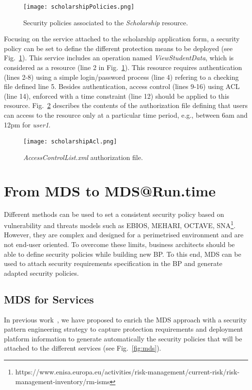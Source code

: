 \documentclass[runningheads,a4paper]{llncs}
\begin{document}
\begin{figure}  
\centering
\texttt{[image: scholarshipPolicies.png]}
\caption{Security policies associated to the \textit{Scholarship} resource.}
\label{fig:policy}
\end{figure}

Focusing on the service attached to the scholarship application form, a security policy can be set to define the different protection means to be deployed (see Fig.~\ref{fig:policy}). This service includes an operation named \textit{ViewStudentData}, which is considered as a resource (line 2 in
Fig.~\ref{fig:policy}). This resource requires authentication (lines 2-8) using a simple login/password process (line 4) refering to a checking file defined line 5. Besides authentication, access control (lines 9-16) using ACL (line 14), enforced with a time constraint (line 12) should be applied to this resource. Fig.~\ref{fig:acl} describes the contents of the authorization file defining that users can access to the resource only at a particular time period, e.g., between 6am and 12pm for \textit{user1}.
 
\begin{figure}
\centering
\texttt{[image: scholarshipAcl.png]}
\caption{\textit{AccessControlList.xml} authorization file.}
\label{fig:acl}
\end{figure}



\section{From MDS to MDS@Run.time}
\label{MDStoMDSatRuntime}
Different methods can be used to set a consistent security policy based on vulnerability and threats models such as EBIOS, MEHARI, OCTAVE, SNA\footnote{https://www.enisa.europa.eu/activities/risk-management/current-risk/risk-management-inventory/rm-isms}. However, they are complex and designed for a perimetrised environment and are not end-user oriented. To overcome these limits, business architects should be able to define security policies while building new BP. To this end, MDS can be used to attach security requirements specification in the BP and generate adapted security policies.

\subsection{MDS for Services}
In previous work~\cite{OBG12}, we have proposed to enrich the MDS approach with a security pattern engineering strategy to capture protection requirements and deployment platform information to generate automatically the security policies that will be attached to the different services (see Fig.~\ref{fig:mds}).
\end{document}
